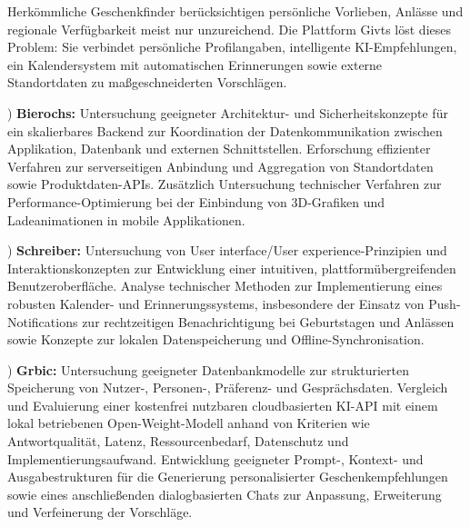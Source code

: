 \abschnittsautor{\alleautoren}


Herkömmliche Geschenkfinder berücksichtigen persönliche Vorlieben, Anlässe und regionale Verfügbarkeit meist nur unzureichend. Die Plattform Givts löst dieses Problem: Sie verbindet persönliche Profilangaben, intelligente KI-Empfehlungen, ein Kalendersystem mit automatischen Erinnerungen sowie externe Standortdaten zu maßgeschneiderten Vorschlägen.


) \textbf{Bierochs:} Untersuchung geeigneter Architektur- und Sicherheitskonzepte für ein skalierbares Backend zur Koordination der Datenkommunikation zwischen Applikation, Datenbank und externen Schnittstellen. Erforschung effizienter Verfahren zur serverseitigen Anbindung und Aggregation von Standortdaten sowie Produktdaten-APIs. Zusätzlich Untersuchung technischer Verfahren zur Performance-Optimierung bei der Einbindung von 3D-Grafiken und Ladeanimationen in mobile Applikationen.

) \textbf{Schreiber:} Untersuchung von User interface/User experience-Prinzipien und Interaktionskonzepten zur Entwicklung einer intuitiven, plattformübergreifenden Benutzeroberfläche. Analyse technischer Methoden zur Implementierung eines robusten Kalender- und Erinnerungssystems, insbesondere der Einsatz von Push-Notifications zur rechtzeitigen Benachrichtigung bei Geburtstagen und Anlässen sowie Konzepte zur lokalen Datenspeicherung und Offline-Synchronisation.

) \textbf{Grbic:} Untersuchung geeigneter Datenbankmodelle zur strukturierten Speicherung von Nutzer-, Personen-, Präferenz- und Gesprächsdaten. Vergleich und Evaluierung einer kostenfrei nutzbaren cloudbasierten KI-API mit einem lokal betriebenen Open-Weight-Modell anhand von Kriterien wie Antwortqualität, Latenz, Ressourcenbedarf, Datenschutz und Implementierungsaufwand. Entwicklung geeigneter Prompt-, Kontext- und Ausgabestrukturen für die Generierung personalisierter Geschenkempfehlungen sowie eines anschließenden dialogbasierten Chats zur Anpassung, Erweiterung und Verfeinerung der Vorschläge.


